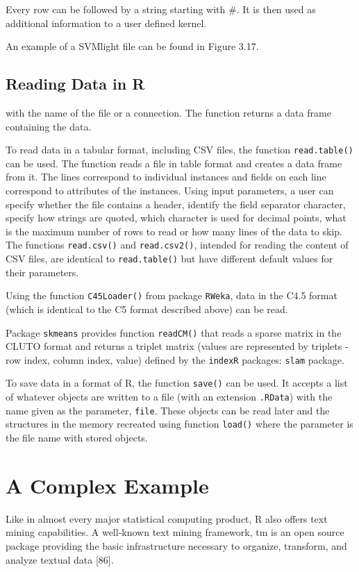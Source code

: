 \documentclass[11pt,openany,executivepaper]{book}
\begin{document}
Every row can be followed by a string starting with \#. It is then used as additional information to a user defined kernel.

An example of a SVMlight file can be found in Figure 3.17.
\subsection{Reading Data in R}
with the name of the file or a connection. The function returns a data frame
containing the data.

\begin{sloppypar}
\raggedright  
To read data in a tabular format, including CSV files, the function
\texttt{read.table()} can be used. The function reads a file in table format and creates
a data frame from it. The lines correspond to individual instances and fields on
each line correspond to attributes of the instances. Using input parameters, a user
can specify whether the file contains a header, identify the field separator character,
specify how strings are quoted, which character is used for decimal points, what is
the maximum number of rows to read or how many lines of the data to skip.
The functions \texttt{read.csv()} and \texttt{read.csv2()}, intended for reading the
content of CSV files, are identical to \texttt{read.table()} but have different default
values for their parameters.

\end{sloppypar}
Using the function \texttt{C45Loader()} from package \texttt{RWeka}, data in the
C4.5 format (which is identical to the C5 format described above) can be read.

Package \texttt{skmeans} provides function \texttt{readCM()} that reads a sparse
matrix in the CLUTO format and returns a triplet matrix (values are represented by
triplets - row index, column index, value) defined by the \texttt{indexR} packages:
\texttt{slam} package.

To save data in a format of R, the function \texttt{save()} can be used. It accepts
a list of whatever objects are written to a file (with an extension \texttt{.RData}) with
the name given as the parameter, \texttt{file}. These objects can be read later and the
structures in the memory recreated using function \texttt{load()} where the parameter
is the file name with stored objects.

\section{A Complex Example}
Like in almost every major statistical computing product, R also offers text mining capabilities. A well-known text mining framework, tm is an open source package providing the basic infrastructure necessary to organize, transform, and analyze textual data [86].
\end{document}
